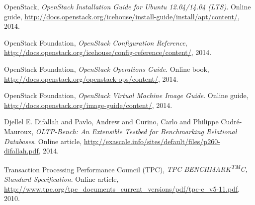 \begin{thebibliography}{9}

	OpenStack, \emph{OpenStack Installation Guide for Ubuntu 12.04/14.04 (LTS)}. 
	Online guide, 
	\url{http://docs.openstack.org/icehouse/install-guide/install/apt/content/}, 
	2014.

	OpenStack Foundation, \emph{OpenStack Configuration Reference}, 
	\url{http://docs.openstack.org/icehouse/config-reference/content/}, 
	2014.

	OpenStack Foundation, \emph{OpenStack Operations Guide}. 
	Online book,
	\url{http://docs.openstack.org/openstack-ops/content/}, 
	2014.

	OpenStack Foundation, \emph{OpenStack Virtual Machine Image Guide}. 
	Online guide,
	\url{http://docs.openstack.org/image-guide/content/}, 
	2014.

  Djellel E. Difallah and Pavlo, Andrew and Curino, Carlo and Philippe Cudr{\'e}-Mauroux,
  \emph{OLTP-Bench: An Extensible Testbed for Benchmarking Relational Databases}.
  Online article, \url{http://exascale.info/sites/default/files/p260-difallah.pdf}, 
  2014.

  Transaction Processing Performance Council (TPC),
  \emph{TPC BENCHMARK\textsuperscript{TM}C, Standard Specification}.
  Online article, \url{http://www.tpc.org/tpc_documents_current_versions/pdf/tpc-c_v5-11.pdf}, 
  2010.









\end{thebibliography}